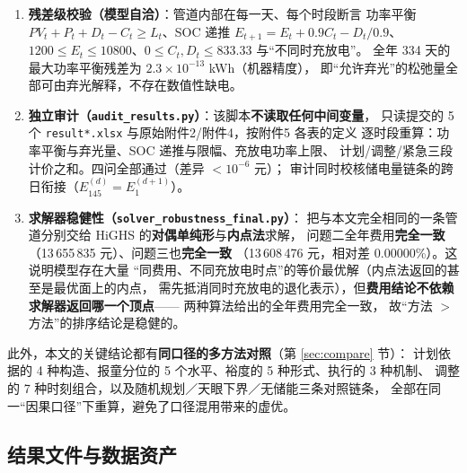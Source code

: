 \begin{enumerate}[label=(\arabic*), leftmargin=2.2em, itemsep=1pt]
\item \textbf{残差级校验（模型自洽\nobreak）}\nobreak：管道内部在每一天\nobreak、每个时段断言
功率平衡 $PV_t+P_t+D_t-C_t\ge L_t$\nobreak、SOC 递推 $E_{t+1}=E_t+0.9C_t-D_t/0.9$\nobreak、
$1200\le E_t\le10800$\nobreak、$0\le C_t,D_t\le833.33$ 与“不同时充放电\nobreak”\nobreak。
全年 334 天的最大功率平衡残差为 $2.3\times10^{-13}$ kWh（机器精度\nobreak）\nobreak，
即“允许弃光\nobreak”的松弛量全部可由弃光解释\nobreak，不存在数值性缺电\nobreak。
\item \textbf{独立审计（\texttt{audit\_results.py}\nobreak）}\nobreak：该脚本\textbf{不读取任何中间变量}\nobreak，
只读提交的 5 个 \texttt{result*.xlsx} 与原始附件2/附件4\nobreak，按附件5 各表的定义
逐时段重算\nobreak：功率平衡与弃光量\nobreak、SOC 递推与限幅\nobreak、充放电功率上限\nobreak、
计划/调整/紧急三段计价之和\nobreak。四问全部通过（差异 $<10^{-6}$ 元\nobreak）\nobreak；
审计同时校核储电量链条的跨日衔接（$E_{145}^{(d)}=E_1^{(d+1)}$\nobreak）\nobreak。
\item \textbf{求解器稳健性（\texttt{solver\_robustness\_final.py}\nobreak）}\nobreak：
把与本文完全相同的一条管道分别交给 HiGHS 的\textbf{对偶单纯形}与\textbf{内点法}求解\nobreak，
问题二全年费用\textbf{完全一致}（13\,655\,835 元\nobreak）\nobreak、问题三也\textbf{完全一致}
（13\,608\,476 元\nobreak，相对差 0.00000\%\nobreak）\nobreak。这说明模型存在大量
“同费用\nobreak、不同充放电时点\nobreak”的等价最优解（内点法返回的甚至是最优面上的内点\nobreak，
需先抵消同时充放电的退化表示\nobreak）\nobreak，但\textbf{费用结论不依赖求解器返回哪一个顶点}——
两种算法给出的全年费用完全一致\nobreak，
故“方法 $>$ 方法\nobreak”的排序结论是稳健的\nobreak。
\end{enumerate}

此外\nobreak，本文的关键结论都有\textbf{同口径的多方法对照}（第 \ref{sec:compare} 节\nobreak）\nobreak：
计划依据的 4 种构造\nobreak、报童分位的 5 个水平\nobreak、裕度的 5 种形式\nobreak、执行的 3 种机制\nobreak、
调整的 7 种时刻组合\nobreak，以及随机规划／天眼下界／无储能三条对照链条\nobreak，
全部在同一“因果口径\nobreak”下重算\nobreak，避免了口径混用带来的虚优\nobreak。

\subsection{结果文件与数据资产}


